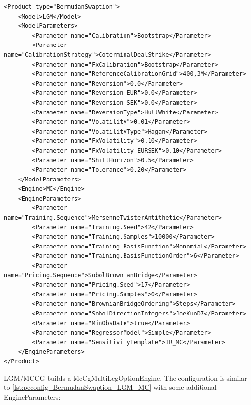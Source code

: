 \begin{longlisting}
\begin{verbatim}
<Product type="BermudanSwaption">
    <Model>LGM</Model>
    <ModelParameters>
        <Parameter name="Calibration">Bootstrap</Parameter>
        <Parameter name="CalibrationStrategy">CoterminalDealStrike</Parameter>
        <Parameter name="FxCalibration">Bootstrap</Parameter>
        <Parameter name="ReferenceCalibrationGrid">400,3M</Parameter>
        <Parameter name="Reversion">0.0</Parameter>
        <Parameter name="Reversion_EUR">0.0</Parameter>
        <Parameter name="Reversion_SEK">0.0</Parameter>
        <Parameter name="ReversionType">HullWhite</Parameter>
        <Parameter name="Volatility">0.01</Parameter>
        <Parameter name="VolatilityType">Hagan</Parameter>
        <Parameter name="FxVolatility">0.10</Parameter>
        <Parameter name="FxVolatility_EURSEK">0.10</Parameter>
        <Parameter name="ShiftHorizon">0.5</Parameter>
        <Parameter name="Tolerance">0.20</Parameter>
    </ModelParameters>
    <Engine>MC</Engine>
    <EngineParameters>
        <Parameter name="Training.Sequence">MersenneTwisterAntithetic</Parameter>
        <Parameter name="Training.Seed">42</Parameter>
        <Parameter name="Training.Samples">10000</Parameter>
        <Parameter name="Training.BasisFunction">Monomial</Parameter>
        <Parameter name="Training.BasisFunctionOrder">6</Parameter>
        <Parameter name="Pricing.Sequence">SobolBrownianBridge</Parameter>
        <Parameter name="Pricing.Seed">17</Parameter>
        <Parameter name="Pricing.Samples">0</Parameter>
        <Parameter name="BrownianBridgeOrdering">Steps</Parameter>
        <Parameter name="SobolDirectionIntegers">JoeKuoD7</Parameter>
        <Parameter name="MinObsDate">true</Parameter>
        <Parameter name="RegressorModel">Simple</Parameter>
        <Parameter name="SensitivityTemplate">IR_MC</Parameter>
    </EngineParameters>
</Product>
\end{verbatim}
\caption{Configuration for Product BermudanSwaption, Model BlackBachelier, Engine BlackBachelierSwaptionEngine}
\label{lst:peconfig_BermudanSwaption_LGM_MC}
\end{longlisting}

LGM/MCCG builds a McCgMultiLegOptionEngine. The configuration is similar to \ref{lst:peconfig_BermudanSwaption_LGM_MC}
with some additional EngineParameters:

